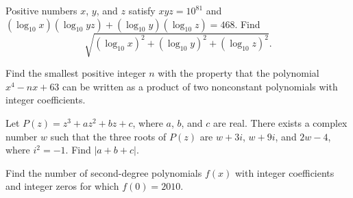 \begin{question}[name={2010 AIME II, \href{https://artofproblemsolving.com/community/c4p1831597}{Problem 5}}]
	Positive numbers $ x$, $ y$, and $ z$ satisfy $ xyz = 10^{81}$ and $ (\log_{10}x)(\log_{10} yz) + (\log_{10}y) (\log_{10}z) = 468$. Find $$ \sqrt {(\log_{10}x)^2 + (\log_{10}y)^2 + (\log_{10}z)^2}.$$	
\end{question}


%	













\begin{question}[name={2010 AIME II, \href{https://artofproblemsolving.com/community/c4p1831598}{Problem 6}}]
	Find the smallest positive integer $ n$ with the property that the polynomial $ x^4 - nx + 63$ can be written as a product of two nonconstant polynomials with integer coefficients.
\end{question}


%	












\begin{question}[name={2010 AIME II, \href{https://artofproblemsolving.com/community/c4p1831732}{Problem 7}}]
	Let $ P(z) = z^3 + az^2 + bz + c$, where $ a$, $ b$, and $ c$ are real. There exists a complex number $ w$ such that the three roots of $ P(z)$ are $ w + 3i$, $ w + 9i$, and $ 2w - 4$, where $ i^2 = - 1$. Find $|a + b + c|$.
\end{question}


%	












\begin{question}[name={2010 AIME II, \href{https://artofproblemsolving.com/community/c4p1831336}{Problem 10}}]
	Find the number of second-degree polynomials $ f(x)$ with integer coefficients and integer zeros for which $ f(0)=2010$.
\end{question}



